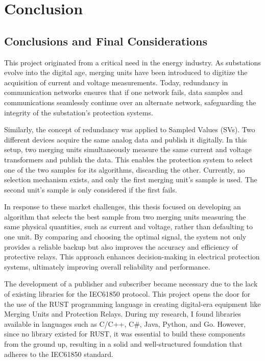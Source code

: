 
\chapter{Conclusion} %

\label{chap:Chapter7} %


\section{Conclusions and Final Considerations}

This project originated from a critical need in the energy industry. As substations evolve into the digital age, merging units have been introduced to digitize the acquisition of current and voltage measurements. Today, redundancy in communication networks ensures that if one network fails, data samples and communications seamlessly continue over an alternate network, safeguarding the integrity of the substation's protection systems.

Similarly, the concept of redundancy was applied to Sampled Values (SVs). Two different devices acquire the same analog data and publish it digitally. In this setup, two merging units simultaneously measure the same current and voltage transformers and publish the data. This enables the protection system to select one of the two samples for its algorithms, discarding the other. Currently, no selection mechanism exists, and only the first merging unit’s sample is used. The second unit’s sample is only considered if the first fails.

In response to these market challenges, this thesis focused on developing an algorithm that selects the best sample from two merging units measuring the same physical quantities, such as current and voltage, rather than defaulting to one unit. By comparing and choosing the optimal signal, the system not only provides a reliable backup but also improves the accuracy and efficiency of protective relays. This approach enhances decision-making in electrical protection systems, ultimately improving overall reliability and performance.

The development of a publisher and subscriber became necessary due to the lack of existing libraries for the IEC61850 protocol. This project opens the door for the use of the RUST programming language in creating digital-era equipment like Merging Units and Protection Relays. During my research, I found libraries available in languages such as C/C++, C\#, Java, Python, and Go. However, since no library existed for RUST, it was essential to build these components from the ground up, resulting in a solid and well-structured foundation that adheres to the IEC61850 standard.


